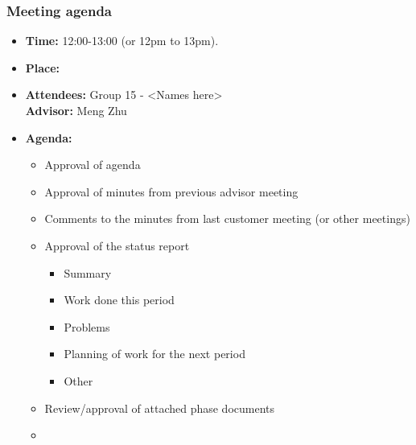\subsubsection{Meeting agenda }
\begin{itemize}
\item \textbf{Time:} 12:00-13:00 (or 12pm to 13pm).
\item \textbf{Place:} \\
\item \textbf{Attendees:} Group 15 - <Names here> \\ \textbf{Advisor:} Meng Zhu
\item \textbf{Agenda:} 
	\begin{itemize}
	\item Approval of agenda
	\item Approval of minutes from previous advisor meeting
	\item Comments to the minutes from last customer meeting (or other meetings)
	\item Approval of the status report
		\begin{itemize}
		\item Summary
		\item Work done this period
		\item Problems
		\item Planning of work for the next period
		\item Other
	\end{itemize}
	\item Review/approval of attached phase documents
	\item <add other agenda items here>
	\end{itemize}
\end{itemize}
